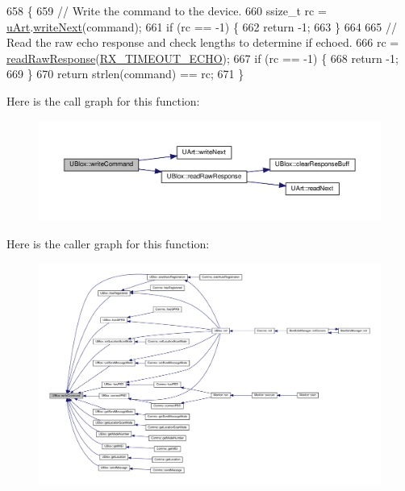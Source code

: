 \begin{DoxyCode}
658 \{
659     \textcolor{comment}{// Write the command to the device.}
660     ssize\_t rc = \hyperlink{class_u_blox_a034c0463d1c199d094d657c8ebb151e8}{uArt}.\hyperlink{class_u_art_aad1ddb133fe430a92527584eec2e674f}{writeNext}(command);
661     \textcolor{keywordflow}{if} (rc == -1) \{
662         \textcolor{keywordflow}{return} -1;
663     \}
664 
665     \textcolor{comment}{// Read the raw echo response and check lengths to determine if echoed.}
666     rc = \hyperlink{class_u_blox_ab4a7ab4b8922d91e23f273ae160c1bed}{readRawResponse}(\hyperlink{_u_blox_8cpp_a55092c0742d15bb08a5ea7db5a25440e}{RX\_TIMEOUT\_ECHO});
667     \textcolor{keywordflow}{if} (rc == -1) \{
668         \textcolor{keywordflow}{return} -1;
669     \}
670     \textcolor{keywordflow}{return} strlen(command) == rc;
671 \}
\end{DoxyCode}
Here is the call graph for this function\+:\nopagebreak
\begin{figure}[H]
\begin{center}
\leavevmode
\includegraphics[width=350pt]{da/df6/class_u_blox_af604d1897a66192bf1c2a11997f2634d_cgraph}
\end{center}
\end{figure}
Here is the caller graph for this function\+:\nopagebreak
\begin{figure}[H]
\begin{center}
\leavevmode
\includegraphics[width=350pt]{da/df6/class_u_blox_af604d1897a66192bf1c2a11997f2634d_icgraph}
\end{center}
\end{figure}


